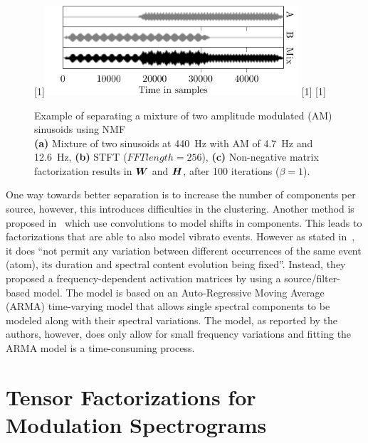 \begin{figure}[H]
\centering
{}%
[1\textwidth]{\includegraphics[width=0.84\textwidth]{Chapters/05_Separation_Known/figures/Timepdf-crop.pdf}}%
\hspace{0.2\textwidth} %
[1\textwidth]{}%
\hspace{0.3\textwidth} %
[1\textwidth]{}%
\caption{Example of separating a mixture of two amplitude modulated (AM) sinusoids using \acs{NMF}\\ \textbf{(a)} Mixture of two sinusoids at \SI{440}{\hertz} with AM of \SI{4.7}{\hertz} and \SI{12.6}{\hertz}, \textbf{(b)} \acs{STFT} ($FFT length = 256$), \textbf{(c)} Non-negative matrix factorization results in ${\bm{W}}$ and ${\bm{H}}$, after 100 iterations ($\beta = 1$).}
\label{fig:am_tensor_nmf}
\end{figure}

One way towards better separation is to increase the number of components per source, however, this introduces difficulties in the clustering.
Another method is proposed in~\cite{smaragdis04, fitzgerald05s, jaiswal13, rodriguezserrano16} which use convolutions to model shifts in components.
This leads to factorizations that are able to also model vibrato events.
However as stated in~\cite{hennequin11}, it does ``not  permit  any variation  between  different  occurrences  of  the  same event (atom), its duration and spectral content evolution being fixed''. 
Instead, they proposed a frequency-dependent activation matrices by using a source/filter-based model.
The model is based on an Auto-Regressive Moving Average (ARMA) time-varying model that allows single spectral components to be modeled along with their spectral variations. 
The model, as reported by the authors, however, does only allow for small frequency variations and fitting the ARMA model is a time-consuming process.

\section{Tensor Factorizations for Modulation Spectrograms}
\label{sub:am}

